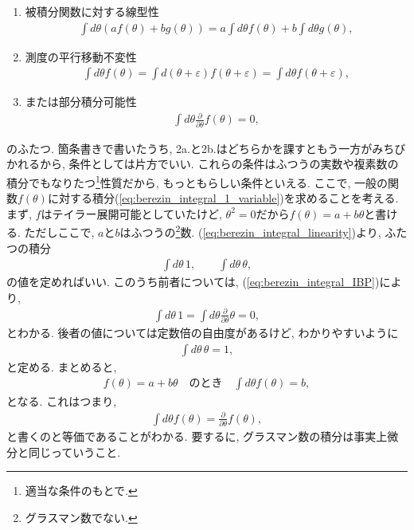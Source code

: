 \documentclass{ltjsarticle}
\theoremstyle{definition}
\newcommand{\parno}{\par\noindent}
\begin{document}
\begin{enumerate}
  \item 被積分関数に対する線型性
  \begin{gather}
    \int d\theta \left(af(\theta)+bg(\theta)\right)=a\int d\theta f(\theta)+b\int d\theta g(\theta),\label{eq:berezin_integral_linearity}
  \end{gather}
  \item[2a.] 測度の平行移動不変性
  \begin{gather}
    \int d\theta f(\theta)=\int d(\theta+\varepsilon)f(\theta+\varepsilon)=\int d\theta f(\theta+\varepsilon),
  \end{gather}
  \item[2b.]または部分積分可能性
  \begin{gather}
    \int d\theta\frac\partial{\partial\theta}f(\theta)=0,\label{eq:berezin_integral_IBP}
  \end{gather}
\end{enumerate}
のふたつ. 箇条書きで書いたうち, 2a.と2b.はどちらかを課すともう一方がみちびかれるから, 条件としては片方でいい. これらの条件はふつうの実数や複素数の積分でもなりたつ\footnote{適当な条件のもとで.}性質だから, もっともらしい条件といえる. ここで, 一般の関数$f(\theta)$に対する積分(\ref{eq:berezin_integral_1_variable})を求めることを考える. まず, $f$はテイラー展開可能としていたけど, $\theta^2=0$だから$f(\theta)=a+b\theta$と書ける. ただしここで, $a$と$b$はふつうの\footnote{グラスマン数でない.}数. (\ref{eq:berezin_integral_linearity})より, ふたつの積分
\begin{gather}
  \int d\theta\,1,\qquad\int d\theta\,\theta,
\end{gather}
の値を定めればいい. このうち前者については, (\ref{eq:berezin_integral_IBP})により,
\begin{gather}
  \int d\theta\,1=\int d\theta\frac\partial{\partial\theta}\theta=0,
\end{gather}
とわかる. 後者の値については定数倍の自由度があるけど, わかりやすいように
\begin{gather}
  \int d\theta\,\theta=1,
\end{gather}
と定める. まとめると,
\begin{gather}
  f(\theta)=a+b\theta\quad\text{のとき}\quad\int d\theta f(\theta)=b,
\end{gather}
となる. これはつまり,
\begin{gather}
  \int d\theta f(\theta)=\frac\partial{\partial\theta}f(\theta),
\end{gather}
と書くのと等価であることがわかる. 要するに, グラスマン数の積分は事実上微分と同じっていうこと.\parno
\end{document}
